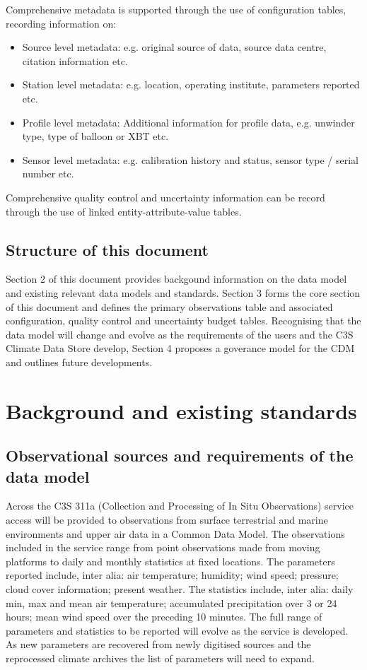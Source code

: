 \documentclass[a4paper,11pt]{article}
\begin{document}
Comprehensive metadata is supported through the use of configuration tables, recording information on:
\begin{itemize}
\item Source level metadata: e.g. original source of data, source data centre, citation information etc.
\item Station level metadata: e.g. location, operating institute, parameters reported etc.
\item Profile level metadata: Additional information for profile data, e.g. unwinder type, type of balloon or XBT etc.
\item Sensor level metadata: e.g. calibration history and status, sensor type / serial number etc.
\end{itemize}
Comprehensive quality control and uncertainty information can be record through the use of linked entity-attribute-value tables.

\subsection {Structure of this document}

Section 2 of this document provides backgound information on the data model and existing relevant data models and standards. Section 3 forms the core section of this document and defines the primary observations table and associated configuration, quality control and uncertainty budget tables. Recognising that the data model will change and evolve as the requirements of the users and the C3S Climate Data Store develop, Section 4 proposes a goverance model for the CDM and outlines future developments.

\section {Background and existing standards}
\subsection {Observational sources and requirements of the data model}

Across the C3S 311a (Collection and Processing of In Situ Observations) service access will be provided to observations from surface terrestrial and marine environments and upper air data in a Common Data Model. The observations included in the service range from point observations made from moving platforms to daily and monthly statistics at fixed locations. The parameters reported include, inter alia: air temperature; humidity; wind speed; pressure; cloud cover information; present weather. The statistics include, inter alia: daily min, max and mean air temperature; accumulated precipitation over 3 or 24 hours; mean wind speed over the preceding 10 minutes. The full range of parameters and statistics to be reported will evolve as the service is developed. As new parameters are recovered from newly digitised sources and the reprocessed climate archives the list of parameters will need to expand.\\
\end{document}
